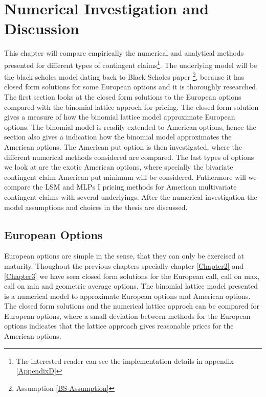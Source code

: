 
\chapter{Numerical Investigation and Discussion} %

\label{Chapter6} %

This chapter will compare empirically the numerical and analytical methods presented for different types of contingent claims\footnote{The interested reader can see the implementation details in appendix \ref{AppendixD}}. The underlying model will be the black scholes model dating back to Black Scholes paper \parencite{B-S-Paper}\footnote{Assumption \ref{BS-Assumption}}, because it has closed form solutions for some European options and it is thoroughly researched.\\

The first section looks at the closed form solutions to the European options compared with the binomial lattice approch for pricing. The closed form solution gives a measure of how the binomial lattice model approximate European options. The binomial model is readily extended to American options, hence the section also gives a indication how the binomial model approximates the American options. The American put option is then investigated, where the different numerical methods considered are compared. The last types of options we look at are the exotic American options, where specially the bivariate contingent claim American put minimum will be considered. Futhermore will we compare the LSM and MLPs I pricing methods for American multivariate contingent claims with several underlyings. After the numerical investigation the model assumptions and choices in the thesis are discussed.


\section{European Options}\label{EuroOption}
European options are simple in the sense, that they can only be exercised at maturity. Thoughout the previous chapters specially chapter \ref{Chapter2} and \ref{Chapter3} we have seen closed form solutions for the European call, call on max, call on min and geometric average options. The binomial lattice model presented is a numerical model to approximate European options and American options. The closed form solutions and the numerical lattice approch can be compared for European options, where a small deviation between methods for the European options indicates that the lattice approach gives reasonable prices for the American options.\\

